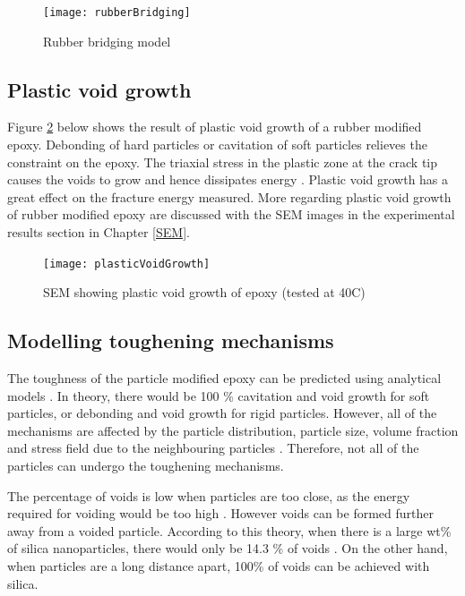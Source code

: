 \documentclass[numbers=noendperiod,chapterprefix=on]{icldt} %
\begin{document}
\begin{figure}[!htpb]
\centering
\texttt{[image: rubberBridging]}
\caption{Rubber bridging model \cite{Guild2010}} \label{rubberBridging}
\end{figure}
\FloatBarrier

\subsection{Plastic void growth} \label{Plastic_Void_growth_ch}
Figure \ref{plasticVoidGrowth} below shows the result of plastic void growth of a rubber modified epoxy. Debonding of hard particles or cavitation of soft particles relieves the constraint on the epoxy. The triaxial stress in the plastic zone at the crack tip causes the voids to grow and hence dissipates energy \cite{Kawaguchi2003}. Plastic void growth has a great effect on the fracture energy measured. More regarding plastic void growth of rubber modified epoxy are discussed with the SEM images in the experimental results section in Chapter \ref{SEM}.

\begin{figure}[!htpb]
\centering
\texttt{[image: plasticVoidGrowth]}
\caption{SEM showing plastic void growth of epoxy (tested at 40\degree C) \cite{Kawaguchi2003}} \label{plasticVoidGrowth}
\end{figure}
\FloatBarrier

\subsection{Modelling toughening mechanisms}
The toughness of the particle modified epoxy can be predicted using analytical models \cite{Hsieh2010a,Hsieh2010}. In theory, there would be 100 \% cavitation and void growth for soft particles, or debonding and void growth for rigid particles. However, all of the mechanisms are affected by the particle distribution, particle size, volume fraction and stress field due to the neighbouring particles \cite{Kunz-Douglass1980}. Therefore, not all of the particles can undergo the toughening mechanisms. 

The percentage of voids is low when particles are too close, as the energy required for voiding would be too high \cite{Hsieh2010a}. However voids can be formed further away from a voided particle. According to this theory, when there is a large wt\% of silica nanoparticles, there would only be 14.3 \% of voids \cite{Hsieh2010a}. On the other hand, when particles are a long distance apart, 100\% of voids can be achieved with silica. 
\end{document}
